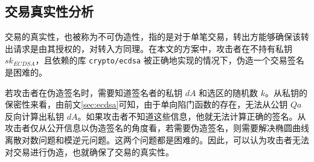 \subsection{交易真实性分析}

交易的真实性，也被称为不可伪造性，指的是对于单笔交易，转出方能够确保该转出请求是由其授权的，对转入方同理。在本文的方案中，攻击者在不持有私钥 $sk_{ECDSA}$，且依赖的库 \verb|crypto/ecdsa| 被正确地实现的情况下，伪造一个交易签名是困难的。

若攻击者在伪造签名时，需要知道签名者的私钥 $dA$ 和选区的随机数 $k$。从私钥的保密性来看，由前文\ref{sec:ecdsa}可知，由于单向陷门函数的存在，无法从公钥 $Qa$ 反向计算出私钥 $dA$。如果攻击者不知道这些信息，他就无法计算正确的签名。从攻击者仅从公开信息以伪造签名的角度看，若需要伪造签名，则需要解决椭圆曲线离散对数问题\cite{Hankerson2011}和模逆元问题。这两个问题都是困难的。因此，可以认为攻击者无法对交易进行伪造，也就确保了交易的真实性。
